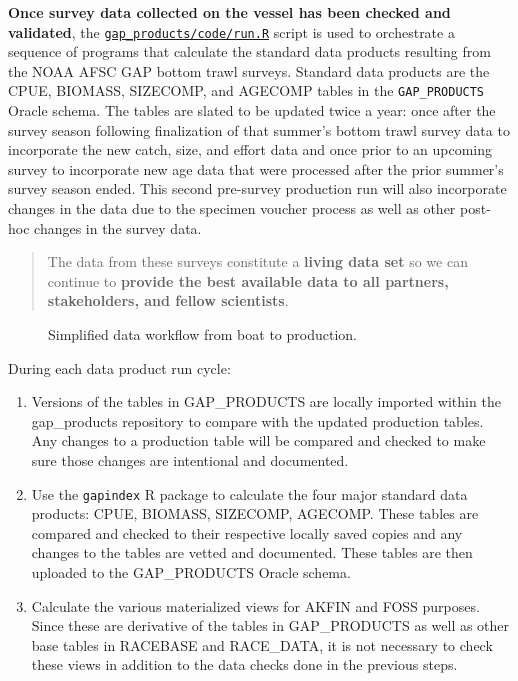 \documentclass[
  letterpaper,
  oneside,
  open=any]{scrbook}
\begin{document}
\textbf{Once survey data collected on the vessel has been checked and
validated}, the
\href{https://github.com/afsc-gap-products/gap_products/blob/main/code/run.R}{\texttt{gap\_products/code/run.R}}
script is used to orchestrate a sequence of programs that calculate the
standard data products resulting from the NOAA AFSC GAP bottom trawl
surveys. Standard data products are the CPUE, BIOMASS, SIZECOMP, and
AGECOMP tables in the \texttt{GAP\_PRODUCTS} Oracle schema. The tables
are slated to be updated twice a year: once after the survey season
following finalization of that summer's bottom trawl survey data to
incorporate the new catch, size, and effort data and once prior to an
upcoming survey to incorporate new age data that were processed after
the prior summer's survey season ended. This second pre-survey
production run will also incorporate changes in the data due to the
specimen voucher process as well as other post-hoc changes in the survey
data.

\begin{quote}
The data from these surveys constitute a \textbf{living data set} so we
can continue to \textbf{provide the best available data to all partners,
stakeholders, and fellow scientists}.
\end{quote}

\begin{figure}


\caption{\label{fig-workflow}Simplified data workflow from boat to
production.}

\end{figure}%

During each data product run cycle:

\begin{enumerate}
\def\labelenumi{\arabic{enumi}.}
\item
  Versions of the tables in GAP\_PRODUCTS are locally imported within
  the gap\_products repository to compare with the updated production
  tables. Any changes to a production table will be compared and checked
  to make sure those changes are intentional and documented.
\item
  Use the \texttt{gapindex} R package to calculate the four major
  standard data products: CPUE, BIOMASS, SIZECOMP, AGECOMP. These tables
  are compared and checked to their respective locally saved copies and
  any changes to the tables are vetted and documented. These tables are
  then uploaded to the GAP\_PRODUCTS Oracle schema.
\item
  Calculate the various materialized views for AKFIN and FOSS purposes.
  Since these are derivative of the tables in GAP\_PRODUCTS as well as
  other base tables in RACEBASE and RACE\_DATA, it is not necessary to
  check these views in addition to the data checks done in the previous
  steps.
\end{enumerate}
\end{document}
